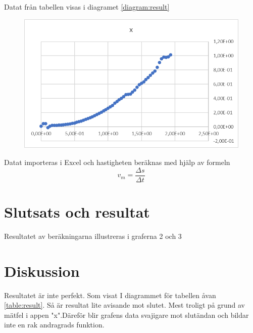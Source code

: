 \documentclass[11p, titlepage, oneside, a4paper]{article}
\begin{document}
Datat från tabellen visas i diagramet \ref{diagram:result}
\begin{figure}
    \centering
    \includegraphics{diagram}
    \caption{}
    \label{fig:}
\end{figure}
    Datat importeras i Excel och hastigheten beräknas med hjälp av formeln
    \begin{equation}
        v_m = \frac{\Delta s}{\Delta t}
    \end{equation}
    
    \section{Slutsats och resultat} 
        Resultatet av beräkningarna illustreras i graferna 2 och 3
    \section{Diskussion} 
    Resultatet är inte perfekt. Som visat I diagrammet för tabellen åvan \ref{table:result}. Så är resultat lite avisande mot slutet. Mest troligt på grund av mätfel i appen "x".Däreför blir grafens data svajigare mot slutändan och bildar inte en rak andragrads funktion.

    
    \printbibliography
\end{document}

